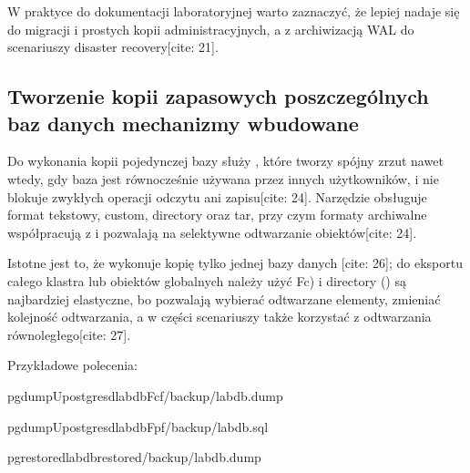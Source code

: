 \documentclass[letterpaper,10pt,polish]{sphinxmanual}
\begin{document}
\sphinxAtStartPar
W praktyce do dokumentacji laboratoryjnej warto zaznaczyć, że  lepiej nadaje się do migracji i prostych kopii administracyjnych, a  z archiwizacją WAL do scenariuszy disaster recovery{[}cite: 21{]}.


\subsection{Tworzenie kopii zapasowych poszczególnych baz danych \sphinxhyphen{} mechanizmy wbudowane}
\label{\detokenize{rozdzial_2/rozdzial_28/index:tworzenie-kopii-zapasowych-poszczegolnych-baz-danych-mechanizmy-wbudowane}}
\sphinxAtStartPar
Do wykonania kopii pojedynczej bazy służy , które tworzy spójny zrzut nawet wtedy, gdy baza jest równocześnie używana przez innych użytkowników, i nie blokuje zwykłych operacji odczytu ani zapisu{[}cite: 24{]}. Narzędzie obsługuje format tekstowy, custom, directory oraz tar, przy czym formaty archiwalne współpracują z  i pozwalają na selektywne odtwarzanie obiektów{[}cite: 24{]}.

\sphinxAtStartPar
Istotne jest to, że  wykonuje kopię tylko jednej bazy danych {[}cite: 26{]}; do eksportu całego klastra lub obiektów globalnych należy użyć \sphinxhyphen{}Fc\textasciigrave{}\textasciigrave{}) i directory () są najbardziej elastyczne, bo pozwalają wybierać odtwarzane elementy, zmieniać kolejność odtwarzania, a w części scenariuszy także korzystać z odtwarzania równoległego{[}cite: 27{]}.

\sphinxAtStartPar
Przykładowe polecenia:

\begin{sphinxVerbatim}[commandchars=\\\{\}]
pg\PYGZus{}dump\PYGZhy{}Upostgres\PYGZhy{}dlabdb\PYGZhy{}Fc\PYGZhy{}f/backup/labdb.dump

pg\PYGZus{}dump\PYGZhy{}Upostgres\PYGZhy{}dlabdb\PYGZhy{}Fp\PYGZhy{}f/backup/labdb.sql

pg\PYGZus{}restore\PYGZhy{}dlabdb\PYGZus{}restored/backup/labdb.dump
\end{sphinxVerbatim}
\end{document}
